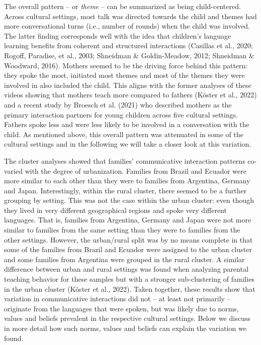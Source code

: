 \documentclass[
  man,floatsintext]{apa6}
\begin{document}
The overall pattern -- or \emph{theme} -- can be summarized as being child-centered. Across cultural settings, most talk was directed towards the child and themes had more conversational turns (i.e., number of rounds) when the child was involved. The latter finding corresponds well with the idea that children's language learning benefits from coherent and structured interactions (Casillas et al., 2020; Rogoff, Paradise, et al., 2003; Shneidman \& Goldin-Meadow, 2012; Shneidman \& Woodward, 2016). Mothers seemed to be the driving force behind this pattern: they spoke the most, initiated most themes and most of the themes they were involved in also included the child. This aligns with the former analyses of these videos showing that mothers teach more compared to fathers (Köster et al., 2022) and a recent study by Broesch et al. (2021) who described mothers as the primary interaction partners for young children across five cultural settings. Fathers spoke less and were less likely to be involved in a conversation with the child. As mentioned above, this overall pattern was attenuated in some of the cultural settings and in the following we will take a closer look at this variation.

The cluster analyses showed that families' communicative interaction patterns co-varied with the degree of urbanization. Families from Brazil and Ecuador were more similar to each other than they were to families from Argentina, Germany and Japan. Interestingly, within the rural cluster, there seemed to be a further grouping by setting. This was not the case within the urban cluster: even though they lived in very different geographical regions and spoke very different languages. That is, families from Argentina, Germany and Japan were not more similar to families from the same setting than they were to families from the other settings. However, the urban/rural split was by no means complete in that some of the families from Brazil and Ecuador were assigned to the urban cluster and some families from Argentina were grouped in the rural cluster. A similar difference between urban and rural settings was found when analyzing parental teaching behavior for these samples but with a stronger sub-clustering of families in the urban cluster (Köster et al., 2022). Taken together, these results show that variation in communicative interactions did not -- at least not primarily -- originate from the languages that were spoken, but was likely due to norms, values and beliefs prevalent in the respective cultural settings. Below we discuss in more detail how such norms, values and beliefs can explain the variation we found.
\end{document}
